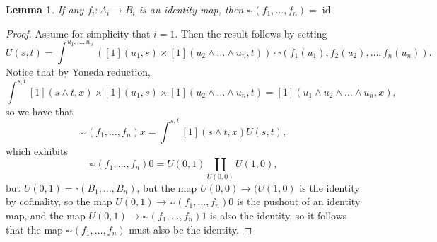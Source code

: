 \documentclass[leqno]{article}
\numberwithin{equation}{subsection}
\theoremstyle{plain}   %
\newtheorem{lemma}[equation]{Lemma}
\theoremstyle{remark}
\theoremstyle{plain}
\DeclareMathOperator{\id}{id}
\begin{document}
\begin{lemma}\label{corneridentities}
	If any \(f_i:A_i\to B_i\) is an identity map, then \(\square^\lrcorner(f_1,\dots,f_n)=\id\)
\end{lemma}
\begin{proof}
	Assume for simplicity that \(i=1\).  Then the result follows by setting 
	\[U(s,t)=\int^{u_1,\dots,u_n} \left([1](u_1,s) \times [1](u_2\wedge\dots\wedge u_n,t)\right)\cdot \square(f_1(u_1),f_2(u_2),\dots, f_n(u_n)).\]
	Notice that by Yoneda reduction,
	\[\int^{s,t} [1](s\wedge t,x) \times [1](u_1,s) \times [1](u_2\wedge\dots\wedge u_n,t) = [1](u_1 \wedge u_2 \wedge \dots\wedge u_n,x),\]
	so we have that 
	\[\square^\lrcorner(f_1,\dots,f_n)x=\int^{s,t} [1](s\wedge t,x) U(s,t),\]
	which exhibits 
	\[\square^\lrcorner(f_1,\dots,f_n)0=U(0,1)\coprod_{U(0,0)} U(1,0),\]
	but \(U(0,1)=\square(B_1,\dots,B_n)\), but the map \(U(0,0) \to (U(1,0)\) is the identity by cofinality, so the map \(U(0,1) \to \square^\lrcorner(f_1,\dots,f_n)0\) is the pushout of an identity map, and the map \(U(0,1)\to \square^\lrcorner(f_1,\dots,f_n)1\) is also the identity, so it follows that the map \(\square^\lrcorner(f_1,\dots,f_n)\) must also be the identity.
\end{proof}
\end{document}
